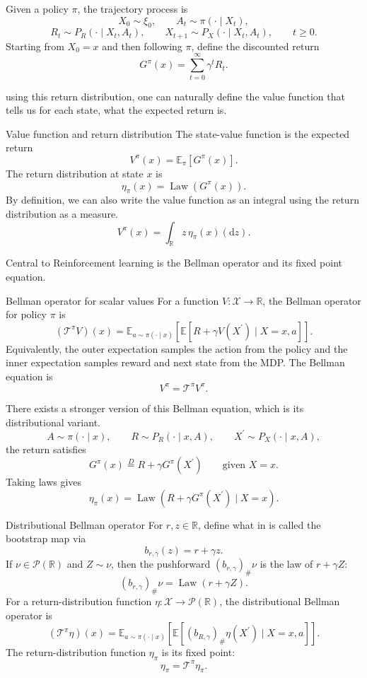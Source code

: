 \documentclass[12pt]{article}
\newcommand{\R}{\mathbb{R}}
\newcommand{\p}{\mathcal{P}}
\newcommand{\E}{\mathbb{E}}
\newcommand{\1}{\mathds{1}}
\newcommand{\X}{\mathcal{X}}
\newcommand{\T}{\mathcal{T}}
\begin{document}
Given a policy $\pi$, the trajectory process is
$$
  X_0\sim\xi_0,
  \qquad
  A_t\sim\pi(\cdot\mid X_t),
$$
$$
  R_t\sim P_R(\cdot\mid X_t,A_t),
  \qquad
  X_{t+1}\sim P_X(\cdot\mid X_t,A_t),
  \qquad t\geq0.
$$
Starting from $X_0=x$ and then following $\pi$, define the discounted return
$$
  G^\pi(x)
  =
  \sum_{t=0}^{\infty}\gamma^tR_t.
$$

using this return distribution, one can naturally define the value function that tells us for each state, what the expected return is. 

\begin{definition}{Value function and return distribution}{}
The state-value function is the expected return
$$
  V^\pi(x)
  =
  \E_\pi[G^\pi(x)].
$$
The return distribution at state $x$ is
$$
  \eta_\pi(x)
  =
  \operatorname{Law}(G^\pi(x)).
$$
By definition, we can also write the value function as an integral using the return distribution as a measure. 
$$
  V^\pi(x)
  =
  \int_\R z\,\eta_\pi(x)(\mathrm dz).
$$
\end{definition}

Central to Reinforcement learning is the Bellman operator and its fixed point equation.

\begin{definition}{Bellman operator for scalar values}{}
For a function $V:\X\to\R$, the Bellman operator for policy $\pi$ is
$$
  (\T^\pi V)(x)
  =
  \E_{a\sim\pi(\cdot\mid x)}
  \left[
    \E\left[
      R+\gamma V(X^{\prime})
      \mid X=x,a
    \right]
  \right].
$$
Equivalently, the outer expectation samples the action from the policy and the
inner expectation samples reward and next state from the MDP. The Bellman
equation is
$$
  V^\pi=\T^\pi V^\pi.
$$
\end{definition}

There exists a stronger version of this Bellman equation, which is its distributional variant. 
$$
  A\sim\pi(\cdot\mid x),
  \qquad
  R\sim P_R(\cdot\mid x,A),
  \qquad
  X^{\prime}\sim P_X(\cdot\mid x,A),
$$
the return satisfies
$$
  G^\pi(x)
  \overset{D}{=}
  R+\gamma G^\pi(X^{\prime})
  \qquad\text{given }X=x.
$$
Taking laws gives
$$
  \eta_\pi(x)
  =
  \operatorname{Law}\left(
    R+\gamma G^\pi(X^{\prime})
    \mid X=x
  \right).
$$

\begin{definition}{Distributional Bellman operator}{}
For $r,z\in\R$, define what in \cite{bellemare2023distributional} is called the bootstrap map via
$$
  b_{r,\gamma}(z)=r+\gamma z.
$$
If $\nu\in\p(\R)$ and $Z\sim\nu$, then the pushforward
$(b_{r,\gamma})_\#\nu$ is the law of $r+\gamma Z$:
$$
  (b_{r,\gamma})_\#\nu
  =
  \operatorname{Law}(r+\gamma Z).
$$
For a return-distribution function $\eta:\X\to\p(\R)$, the distributional
Bellman operator is
$$
  (\T^\pi\eta)(x)
  =
  \E_{a\sim\pi(\cdot\mid x)}
  \left[
    \E\left[
      (b_{R,\gamma})_\#\eta(X^{\prime})
      \mid X=x,a
    \right]
  \right].
$$
The return-distribution function $\eta_\pi$ is its fixed point:
$$
\eta_\pi=\T^\pi\eta_\pi.
$$
\end{definition}
\end{document}
